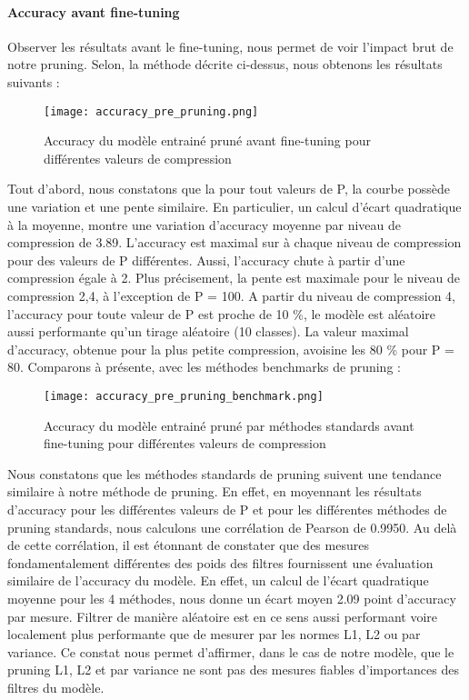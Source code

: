 \documentclass[12pt,a4paper]{article}
\begin{document}
\paragraph{Accuracy avant fine-tuning}
Observer les résultats avant le fine-tuning, nous permet de voir l'impact brut de notre pruning. Selon, la méthode décrite ci-dessus, nous obtenons les résultats suivants :
\begin{figure}[H] %
    \centering    %
    \texttt{[image: accuracy\_pre\_pruning.png]} %
    \caption{Accuracy du modèle entrainé pruné avant fine-tuning pour différentes valeurs de compression} %
    \label{fig:mon_image} %
\end{figure}
Tout d'abord, nous constatons que la pour tout valeurs de P, la courbe possède une variation et une pente similaire. En particulier, un calcul d'écart quadratique à la moyenne, montre une variation d'accuracy moyenne par niveau de compression de 3.89. L'accuracy est maximal sur à chaque niveau de compression pour des valeurs de P différentes. Aussi, l'accuracy chute à partir d'une compression égale à 2. Plus précisement, la pente est maximale pour le niveau de compression 2,4, à l'exception de P = 100. A partir du niveau de compression 4, l'accuracy pour toute valeur de P est proche de 10 \%, le modèle est aléatoire aussi performante qu'un tirage aléatoire (10 classes).
La valeur maximal d'accuracy, obtenue pour la plus petite compression, avoisine les 80 \% pour P = 80. Comparons à présente, avec les méthodes benchmarks de pruning : 
\begin{figure}[H] %
    \centering    %
    \texttt{[image: accuracy\_pre\_pruning\_benchmark.png]} %
    \caption{Accuracy du modèle entrainé pruné par méthodes standards avant fine-tuning pour différentes valeurs de compression} %
    \label{fig:mon_image} %
\end{figure}
Nous constatons que les méthodes standards de pruning suivent une tendance similaire à notre méthode de pruning. En effet, en moyennant les résultats d'accuracy pour les différentes valeurs de P et pour les différentes méthodes de pruning standards, nous calculons une corrélation de Pearson de 0.9950. Au delà de cette corrélation, il est étonnant de constater que des mesures fondamentalement différentes des poids des filtres fournissent une évaluation similaire de l'accuracy du modèle. En effet, un calcul de l'écart quadratique moyenne pour les 4 méthodes, nous donne un écart moyen 2.09 point d'accuracy par mesure. Filtrer de manière aléatoire est en ce sens aussi performant voire localement plus performante que de mesurer par les normes L1, L2 ou par variance. Ce constat nous permet d'affirmer, dans le cas de notre modèle, que le pruning L1, L2 et par variance ne sont pas des mesures fiables d'importances des filtres du modèle. 
\end{document}
